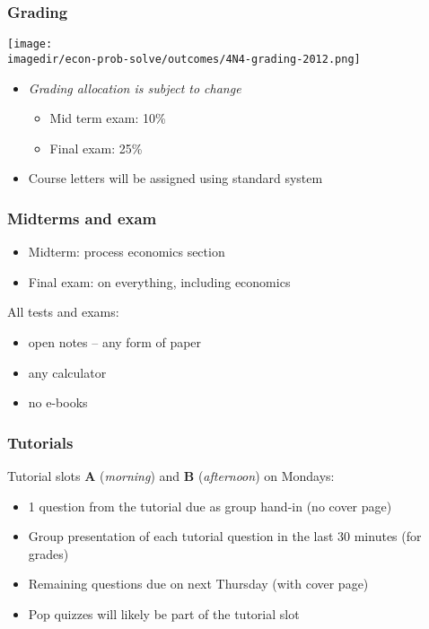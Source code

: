 \begin{frame}\frametitle{Grading}
	\begin{center}
		\texttt{[image: \\imagedir/econ-prob-solve/outcomes/4N4-grading-2012.png]}
	\end{center}
	\begin{itemize}
		\item	\emph{Grading allocation is subject to change}
		\begin{itemize}
			\item	Mid term exam: 10\%
			\item	Final exam: 25\%
		\end{itemize}
		\item	Course letters will be assigned using standard system
	\end{itemize}
\end{frame}

\begin{frame}\frametitle{Midterms and exam}
	
	\begin{itemize}
		\item	Midterm: process economics section
		\item	Final exam: on everything, including economics
	\end{itemize}
	\vspace{24pt}
	All tests and exams:
	\begin{itemize}
		\item	open notes -- any form of paper
		\item	any calculator
		\item	no e-books
	\end{itemize}	
\end{frame}

\begin{frame}\frametitle{Tutorials}
	Tutorial slots \textbf{A} (\emph{morning}) and \textbf{B} (\emph{afternoon}) on Mondays:
	
	\begin{itemize}
		\item	1 question from the tutorial due as group hand-in {\scriptsize (no cover page)}
		\item	Group presentation of each tutorial question in the last 30 minutes {\scriptsize (for grades)}
		\item	Remaining questions due on next Thursday {\scriptsize (with cover page)}
		\item	Pop quizzes will likely be part of the tutorial slot
	\end{itemize}
\end{frame}

